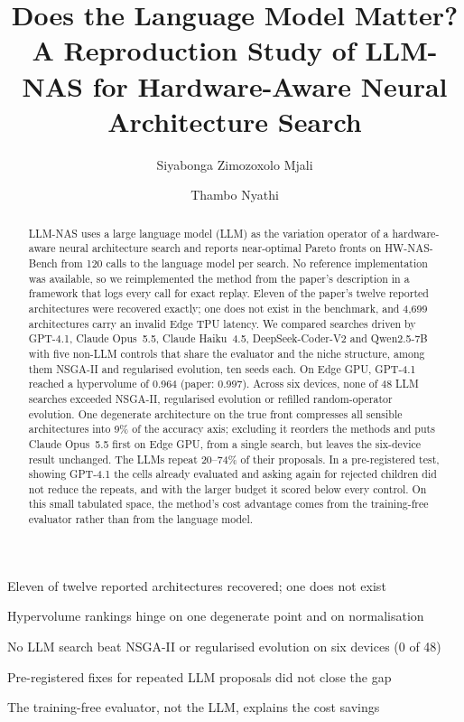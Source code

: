 \documentclass[preprint,12pt,authoryear]{elsarticle}
\begin{document}
\begin{frontmatter}

\title{Does the Language Model Matter? A Reproduction Study of LLM-NAS for Hardware-Aware Neural Architecture Search}

\author[up_cs]{Siyabonga Zimozoxolo Mjali}
\author[up_cs]{Thambo Nyathi}

\begin{abstract}
LLM-NAS uses a large language model (LLM) as the variation operator of a hardware-aware neural architecture search and reports near-optimal Pareto fronts on HW-NAS-Bench from 120 calls to the language model per search. No reference implementation was available, so we reimplemented the method from the paper's description in a framework that logs every call for exact replay. Eleven of the paper's twelve reported architectures were recovered exactly; one does not exist in the benchmark, and 4{,}699 architectures carry an invalid Edge TPU latency. We compared searches driven by GPT-4.1, Claude Opus~5.5, Claude Haiku~4.5, DeepSeek-Coder-V2 and Qwen2.5-7B with five non-LLM controls that share the evaluator and the niche structure, among them NSGA-II and regularised evolution, ten seeds each. On Edge GPU, GPT-4.1 reached a hypervolume of 0.964 (paper: 0.997). Across six devices, none of 48 LLM searches exceeded NSGA-II, regularised evolution or refilled random-operator evolution. One degenerate architecture on the true front compresses all sensible architectures into 9\% of the accuracy axis; excluding it reorders the methods and puts Claude Opus~5.5 first on Edge GPU, from a single search, but leaves the six-device result unchanged. The LLMs repeat 20--74\% of their proposals. In a pre-registered test, showing GPT-4.1 the cells already evaluated and asking again for rejected children did not reduce the repeats, and with the larger budget it scored below every control. On this small tabulated space, the method's cost advantage comes from the training-free evaluator rather than from the language model.
\end{abstract}

\begin{highlights}
\item Eleven of twelve reported architectures recovered; one does not exist
\item Hypervolume rankings hinge on one degenerate point and on normalisation
\item No LLM search beat NSGA-II or regularised evolution on six devices (0 of 48)
\item Pre-registered fixes for repeated LLM proposals did not close the gap
\item The training-free evaluator, not the LLM, explains the cost savings
\end{highlights}


\end{frontmatter}
\end{document}
